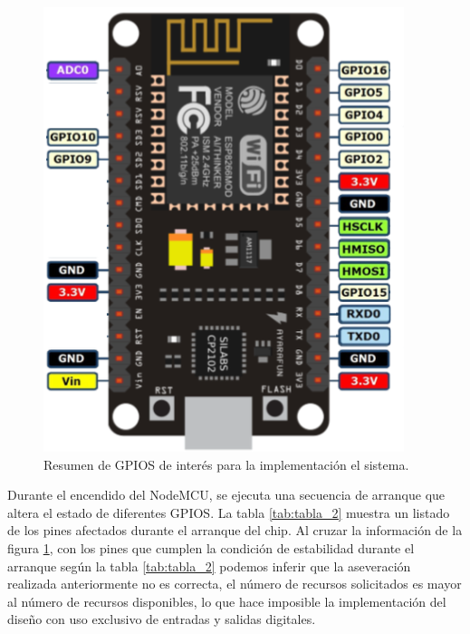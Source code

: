 \begin{figure}[ht]
	\centering
	\includegraphics[scale=.55]{./Figures/Capitulo4/Figura_E.png}
	\caption{Resumen de GPIOS de interés para la implementación el sistema.}
	\label{fig:figura_e}
\end{figure}

Durante el encendido del NodeMCU, se ejecuta una secuencia de arranque que altera el estado de diferentes GPIOS. La tabla \ref{tab:tabla_2} muestra un listado de los pines afectados durante el arranque del chip. Al cruzar la información de la figura \ref{fig:figura_e}, con los pines que cumplen la condición de estabilidad durante el arranque según la tabla \ref{tab:tabla_2} podemos inferir que la aseveración realizada anteriormente no es correcta, el número de recursos solicitados es mayor al número de recursos disponibles, lo que hace imposible la implementación del diseño con uso exclusivo de entradas y salidas digitales.

